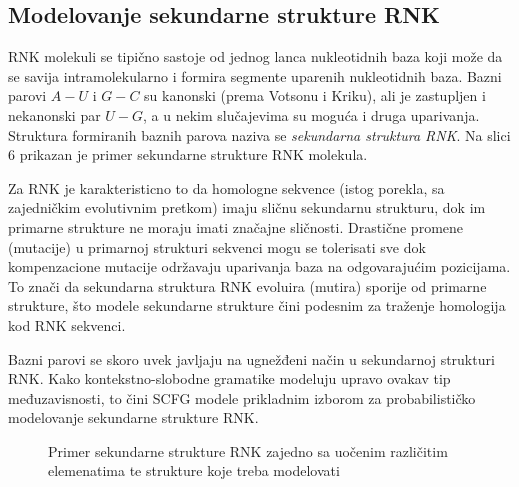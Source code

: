 \documentclass[a4paper, 12pt]{article}
\begin{document}
\subsection{Modelovanje sekundarne strukture RNK}

RNK molekuli se tipično sastoje od jednog lanca nukleotidnih baza koji može da se savija intramolekularno i formira segmente uparenih nukleotidnih baza. Bazni parovi $A-U$ i $G-C$ su kanonski (prema Votsonu i Kriku), ali je zastupljen i nekanonski par $U-G$, a u nekim slučajevima su moguća i druga uparivanja. Struktura formiranih baznih parova naziva se \textit{sekundarna struktura RNK}. Na slici 6 prikazan je primer sekundarne strukture RNK molekula.

Za RNK je karakteristicno to da homologne sekvence (istog porekla, sa zajedničkim evolutivnim pretkom) imaju sličnu sekundarnu strukturu, dok im primarne strukture ne moraju imati značajne sličnosti. Drastične promene (mutacije) u primarnoj strukturi sekvenci mogu se tolerisati sve dok kompenzacione mutacije održavaju uparivanja baza na odgovarajućim pozicijama. To znači da sekundarna struktura RNK evoluira (mutira) sporije od primarne strukture, što modele sekundarne strukture čini podesnim za traženje homologija kod RNK sekvenci.

Bazni parovi se skoro uvek javljaju na ugnežđeni način u sekundarnoj strukturi RNK. Kako kontekstno-slobodne gramatike modeluju upravo ovakav tip međuzavisnosti, to čini SCFG modele prikladnim izborom za probabilističko modelovanje sekundarne strukture RNK.

\newpage

\begin{figure}[h!]
    \centering
    \captionsetup{width=0.7\linewidth}
    \vspace{-0.15cm}
    \vspace{0.1cm}
    \caption{Primer sekundarne strukture RNK zajedno sa uočenim različitim elemenatima te strukture koje treba modelovati}
\end{figure}
\end{document}
